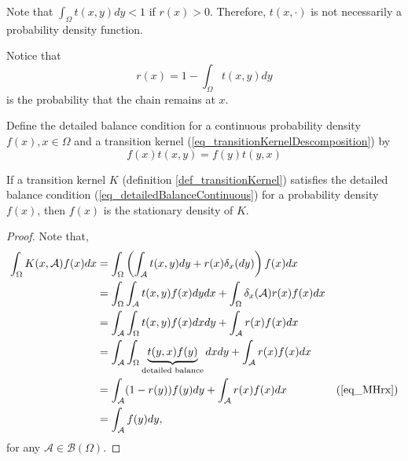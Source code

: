 \begin{remark}
 Note that $\int_{\Omega} t(x,y)dy < 1$ if $r(x) > 0$. Therefore, $t(x, \cdot)$ is not necessarily a probability density function.
\end{remark}

\begin{remark}
Notice that
\begin{equation} \label{eq_MHrx}
  r(x) = 1 - \int_{\Omega} t(x,y)dy
\end{equation}
is the probability that the chain remains at $x$.
\end{remark}

Define the detailed balance condition for a continuous probability density $f(x), x\in\Omega$ and a transition kernel (\ref{eq_transitionKernelDescomposition}) by
\begin{equation} \label{eq_detailedBalanceContinuous}
  f(x)t(x,y) = f(y)t(y,x)
\end{equation}

\begin{proposition} \label{prop_detailedBalanceContinuous}
  If a transition kernel $K$ (definition \ref{def_transitionKernel}) satisfies the detailed balance condition (\ref{eq_detailedBalanceContinuous}) for a probability density $f(x)$, then $f(x)$ is the stationary density of $K$.
  \begin{proof}
   Note that,
   $$
    \begin{aligned}
      \int_{\Omega} K(x,\mathcal{A})f(x)dx &= \int_{\Omega} 
        \left( \int_{\mathcal{A}} t(x,y)dy + r(x)\delta_x(dy) \right) f(x) dx \\
        &= \int_{\Omega} \int_{\mathcal{A}} t(x,y)f(x) dy dx
          + \int_{\Omega} \delta_x(\mathcal{A}) r(x)f(x) dx \\
        &= \int_{\mathcal{A}} \int_{\Omega} t(x,y)f(x) dx dy
          + \int_{\mathcal{A}} r(x)f(x)dx \\
        &= \int_{\mathcal{A}} \int_{\Omega} \underbrace{t(y,x)f(y)}_{\text{detailed balance}} dx dy
          + \int_{\mathcal{A}} r(x)f(x)dx \\
        &= \int_{\mathcal{A}} (1-r(y))f(y) dy
          + \int_{\mathcal{A}} r(x)f(x)dx & \text{(\ref{eq_MHrx})} \\
        &= \int_{\mathcal{A}} f(y)dy,
    \end{aligned}
   $$
   for any $\mathcal{A} \in \mathcal{B}(\Omega)$.
  \end{proof}
\end{proposition}

